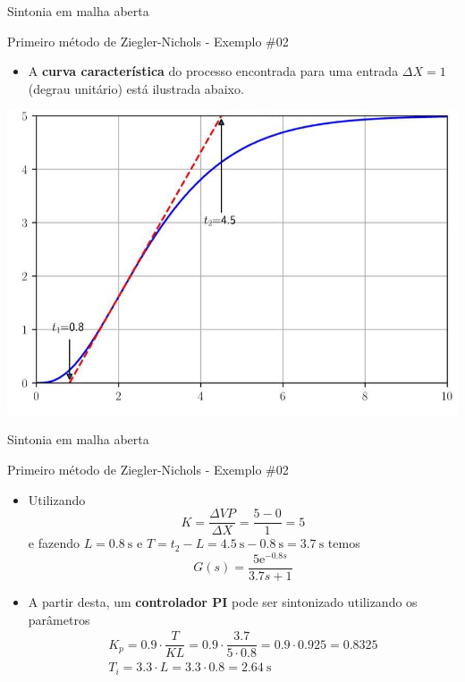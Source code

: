 \begin{frame}{Sintonia em malha aberta}
	\begin{block}{Primeiro método de Ziegler-Nichols - Exemplo \#02}
		\begin{itemize}
			\item A \textbf{curva característica} do processo encontrada para uma entrada $ \Delta X=1 $ (degrau unitário) está ilustrada abaixo.
		\end{itemize}
	\end{block}
	
	\centering
	\includegraphics[width=0.7\linewidth]{Figuras/Ch14/fig3n3}
	
\end{frame}


\begin{frame}{Sintonia em malha aberta}
	\begin{block}{Primeiro método de Ziegler-Nichols - Exemplo \#02}
		\begin{itemize}
			\item Utilizando \[ K=\dfrac{\Delta VP}{\Delta X}=\dfrac{5-0}{1}=5 \] e fazendo $ L=\SI{0.8}{\second} $ e $ T=t_2-L=\SI{4.5}{\second}-\SI{0.8}{\second}=\SI{3.7}{\second} $
			temos \[ G(s)=\dfrac{5
				\text{e}^{-\num{0.8}s}}{\num{3.7}s+1} \]
			\item A partir desta, um \textbf{controlador PI} pode ser sintonizado utilizando os parâmetros
			\begin{gather*}
			K_p=\num{0.9}\cdot\dfrac{T}{KL}=\num{0.9}\cdot\dfrac{\num{3.7}}{\num{5}\cdot\num{0.8}}=\num{0.9}\cdot\num{0.925}=\num{0.8325}\\
			T_i=\num{3.3}\cdot L=\num{3.3}\cdot\num{0.8}=\SI{2.64}{\second}
			\end{gather*}
		\end{itemize}
	\end{block}
\end{frame}


